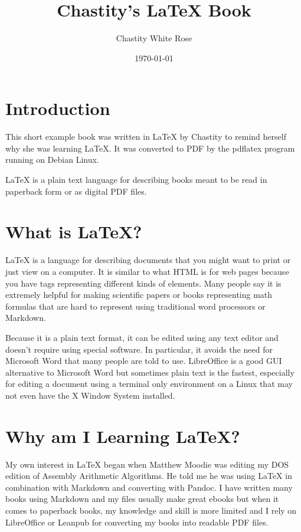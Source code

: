 \documentclass{book}
\title{Chastity's LaTeX Book}
\date{\today}
\author{Chastity White Rose}
\begin{document}
\maketitle
\tableofcontents
{} %

\chapter*{Introduction}

This short example book was written in LaTeX by Chastity to remind herself why she was learning LaTeX. It was converted to PDF by the pdflatex program running on Debian Linux.

LaTeX is a plain text language for describing books meant to be read in paperback form or as digital PDF files.

\chapter{What is LaTeX?}

LaTeX is a language for describing documents that you might want to print or just view on a computer. It is similar to what HTML is for web pages because you have tags representing different kinds of elements. Many people say it is extremely helpful for making scientific papers or books representing math formulas that are hard to represent using traditional word processors or Markdown.

Because it is a plain text format, it can be edited using any text editor and doesn't require using special software. In particular, it avoids the need for Microsoft Word that many people are told to use. LibreOffice is a good GUI alternative to Microsoft Word but sometimes plain text is the fastest, especially for editing a document using a terminal only environment on a Linux that may not even have the X Window System installed.

\chapter{Why am I Learning LaTeX?}

My own interest in LaTeX began when Matthew Moodie was editing my DOS edition of Assembly Arithmetic Algorithms. He told me he was using LaTeX in combination with Markdown and converting with Pandoc. I have written many books using Markdown and my files usually make great ebooks but when it comes to paperback books, my knowledge and skill is more limited and I rely on LibreOffice or Leanpub for converting my books into readable PDF files.
\end{document}
